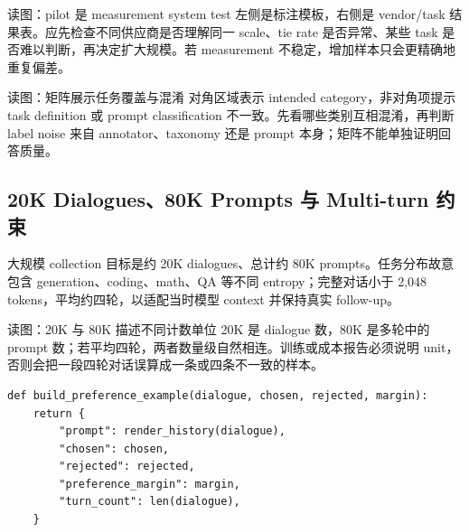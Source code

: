 
\begin{knowledgebox}{读图：pilot 是 measurement system test}
左侧是标注模板，右侧是 vendor/task 结果表。应先检查不同供应商是否理解同一 scale、tie rate 是否异常、某些 task 是否难以判断，再决定扩大规模。若 measurement 不稳定，增加样本只会更精确地重复偏差。
\end{knowledgebox}


\begin{knowledgebox}{读图：矩阵展示任务覆盖与混淆}
对角区域表示 intended category，非对角项提示 task definition 或 prompt classification 不一致。先看哪些类别互相混淆，再判断 label noise 来自 annotator、taxonomy 还是 prompt 本身；矩阵不能单独证明回答质量。
\end{knowledgebox}

\subsection{20K Dialogues、80K Prompts 与 Multi-turn 约束}

大规模 collection 目标是约 20K dialogues、总计约 80K prompts。任务分布故意包含 generation、coding、math、QA 等不同 entropy；完整对话小于 2,048 tokens，平均约四轮，以适配当时模型 context 并保持真实 follow-up。


\begin{knowledgebox}{读图：20K 与 80K 描述不同计数单位}
20K 是 dialogue 数，80K 是多轮中的 prompt 数；若平均四轮，两者数量级自然相连。训练或成本报告必须说明 unit，否则会把一段四轮对话误算成一条或四条不一致的样本。
\end{knowledgebox}


\begin{lstlisting}[caption={把 multi-turn chosen/rejected conversation 转成 DPO batch 的概念结构}]
def build_preference_example(dialogue, chosen, rejected, margin):
    return {
        "prompt": render_history(dialogue),
        "chosen": chosen,
        "rejected": rejected,
        "preference_margin": margin,
        "turn_count": len(dialogue),
    }
\end{lstlisting}

